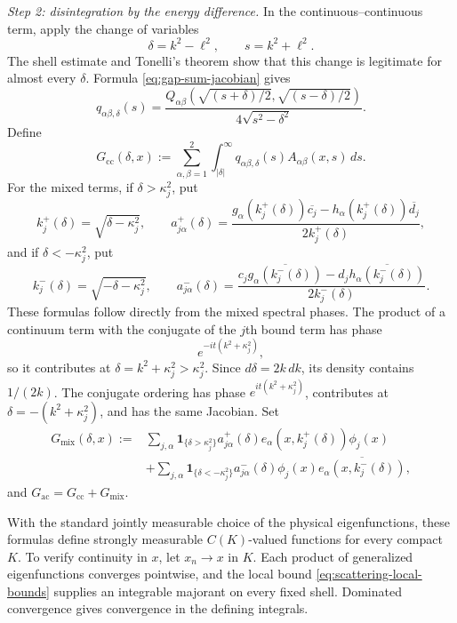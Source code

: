 \documentclass[11pt]{amsart}
\numberwithin{equation}{section}
\theoremstyle{remark}
\newcommand{\ac}{\mathrm{ac}}
\begin{document}
\smallskip
\noindent
\emph{Step 2: disintegration by the energy difference.}
In the continuous--continuous term, apply the change of variables
\[
 \delta=k^2-\ell^2,
 \qquad s=k^2+\ell^2.
\]
The shell estimate and Tonelli's theorem show that this change is legitimate
for almost every $\delta$.  Formula \eqref{eq:gap-sum-jacobian} gives
\begin{equation}
 q_{\alpha\beta,\delta}(s)
 =\frac{
 Q_{\alpha\beta}
 \left(\sqrt{(s+\delta)/2},\sqrt{(s-\delta)/2}\right)
 }{4\sqrt{s^2-\delta^2}}.
 \label{eq:q-from-Q}
\end{equation}
Define
\[
 G_{\mathrm{cc}}(\delta,x)
 :=\sum_{\alpha,\beta=1}^2
   \int_{|\delta|}^{\infty}
   q_{\alpha\beta,\delta}(s)A_{\alpha\beta}(x,s)\,ds.
\]
For the mixed terms, if $\delta>\kappa_j^2$, put
\[
 k_j^+(\delta)=\sqrt{\delta-\kappa_j^2},
 \qquad
 a^+_{j\alpha}(\delta)
 =\frac{
 g_\alpha(k_j^+(\delta))\overline{c_j}
 -h_\alpha(k_j^+(\delta))\overline{d_j}}
 {2k_j^+(\delta)},
\]
and if $\delta<-\kappa_j^2$, put
\[
 k_j^-(\delta)=\sqrt{-\delta-\kappa_j^2},
 \qquad
 a^-_{j\alpha}(\delta)
 =\frac{
 c_j\overline{g_\alpha(k_j^-(\delta))}
 -d_j\overline{h_\alpha(k_j^-(\delta))}}
 {2k_j^-(\delta)}.
\]
These formulas follow directly from the mixed spectral phases.  The product
of a continuum term with the conjugate of the $j$th bound term has phase
\[
 e^{-it(k^2+\kappa_j^2)},
\]
so it contributes at $\delta=k^2+\kappa_j^2>\kappa_j^2$.  Since
$d\delta=2k\,dk$, its density contains $1/(2k)$.  The conjugate ordering has
phase $e^{it(k^2+\kappa_j^2)}$, contributes at
$\delta=-(k^2+\kappa_j^2)$, and has the same Jacobian.  Set
\begin{align*}
 G_{\mathrm{mix}}(\delta,x)
 :={}&\sum_{j,\alpha}\mathbf 1_{\{\delta>\kappa_j^2\}}
 a^+_{j\alpha}(\delta)
 e_\alpha(x,k_j^+(\delta))\phi_j(x)\\
 &+\sum_{j,\alpha}\mathbf 1_{\{\delta<-\kappa_j^2\}}
 a^-_{j\alpha}(\delta)
 \phi_j(x)\overline{e_\alpha(x,k_j^-(\delta))},
\end{align*}
and $G_{\ac}=G_{\mathrm{cc}}+G_{\mathrm{mix}}$.

With the standard jointly measurable choice of the physical eigenfunctions,
these formulas define strongly measurable $C(K)$-valued functions for every
compact $K$.  To verify continuity in $x$, let $x_n\to x$ in $K$.  Each
product of generalized eigenfunctions converges pointwise, and the local bound
\eqref{eq:scattering-local-bounds} supplies an integrable majorant on every
fixed shell.  Dominated convergence gives convergence in the defining
integrals.
\end{document}
